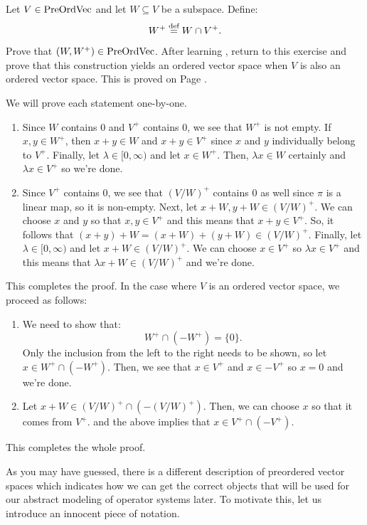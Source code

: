 \documentclass[main.tex]{subfiles}
\begin{document}
\begin{exercise}\label{ex: subspaces of preordered vector spaces are preordered}Let $V \in \text{PreOrdVec}$ and let $W \subseteq V$ be a subspace. Define: 
\[W^+ \stackrel{\text{def}}{=} W \cap V^+.\]  
Prove that $(W,W^+) \in \text{PreOrdVec}$. After learning , return to this exercise and prove that this construction yields an ordered vector space when $V$ is also an ordered vector space. This is proved on Page \pageref{sol: subspaces and quotients of preordered vector spaces are preordered}.
\end{exercise}
\begin{solution}\label{sol: subspaces and quotients of preordered vector spaces are preordered}We will prove each statement one-by-one.
\begin{enumerate}
    \item Since $W$ contains $0$ and $V^+$ contains $0$, we see that $W^+$ is not empty. If $x,y \in W^+$, then $x+y \in W$ and $x+y \in V^+$ since $x$ and $y$ individually belong to $V^+$. Finally, let $\lambda \in [0,\infty)$ and let $x \in W^+$. Then, $\lambda x \in W$ certainly and $\lambda x \in V^+$ so we're done. 
    \item Since $V^+$ contains $0$, we see that $(V/W)^+$ contains $0$ as well since $\pi$ is a linear map, so it is non-empty. Next, let $x+W,y+W \in (V/W)^+$. We can choose $x$ and $y$ so that $x,y \in V^+$ and this means that $x+y \in V^+$. So, it follows that $(x+y)+W = (x+W) + (y+W) \in (V/W)^+$. Finally, let $\lambda \in [0,\infty)$ and let $x+W \in (V/W)^+$. We can choose $x \in V^+$ so $\lambda x \in V^+$ and this means that $\lambda x+W \in (V/W)^+$ and we're done. 
\end{enumerate}
This completes the proof. In the case where $V$ is an ordered vector space, we proceed as follows:
\begin{enumerate}
    \item We need to show that:
    \[W^+ \cap (-W^+) = \{0\}.\] 
    Only the inclusion from the left to the right needs to be shown, so let $x \in W^+ \cap (-W^+)$. Then, we see that $x \in V^+$ and $x \in -V^+$ so $x = 0$ and we're done. 
    \item Let $x+W \in (V/W)^+ \cap (-(V/W)^+)$. Then, we can choose $x$ so that it comes from $V^+$. and the above implies that $x \in V^+ \cap (-V^+)$.  
\end{enumerate}
This completes the whole proof. 
\end{solution}

As you may have guessed, there is a different description of preordered vector spaces which indicates how we can get the correct objects that will be used for our abstract modeling of operator systems later. To motivate this, let us introduce an innocent piece of notation. 
\end{document}
